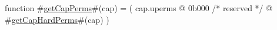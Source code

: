 function #\hyperref[zgetCapPerms]{getCapPerms}#(cap) = 
  (
    cap.uperms
      @ 0b000 /* reserved */
      @ #\hyperref[zgetCapHardPerms]{getCapHardPerms}#(cap)
  )
